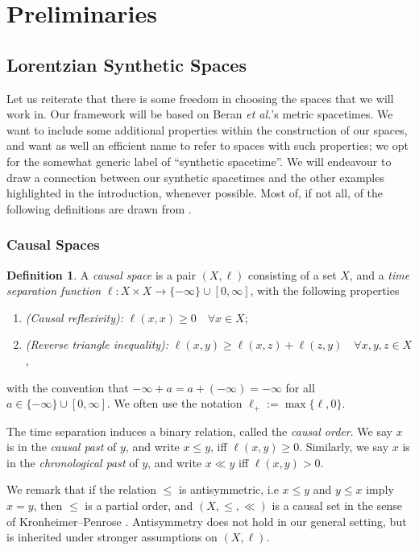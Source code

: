 \documentclass{article}
\theoremstyle{definition}
\newtheorem{defn}{Definition}[section]
\begin{document}
\section{Preliminaries} 
\subsection{Lorentzian Synthetic Spaces}
Let us reiterate that there is some freedom in choosing the spaces that we will work in. Our framework will be based on Beran {\it et al.\@}'s metric spacetimes. We want to include some additional properties within the construction of our spaces, and want as well an efficient name to refer to spaces with such properties; we opt for the somewhat generic label of ``synthetic spacetime''. We will endeavour to draw a connection between our synthetic spacetimes and the other examples highlighted in the introduction, whenever possible. Most of, if not all, of the following definitions are drawn from \cite{McCannII}. 
\subsubsection{Causal Spaces}
\begin{defn}
A {\it causal space} is a pair $(X,\ell)$ consisting of a set $X$, and a {\it time separation function} $\ell: X\times X\to \{-\infty\}\cup [0,\infty]$, with the following properties
\begin{enumerate}
\item {\it (Causal reflexivity):} $\ell(x,x)\geq 0\quad \forall x\in X$;
\item {\it (Reverse triangle inequality):} $\ell(x,y)\geq \ell(x,z)+\ell(z,y) \quad \forall x,y,z\in X$,
\end{enumerate}
with the convention that $-\infty+a=a+(-\infty) =-\infty$ for all $a\in \{-\infty\}\cup [0,\infty]$. We often use the notation $\ell_+:= \max\{\ell, 0\}$. 
\end{defn}
The time separation induces a binary relation, called the {\it causal order}. We say $x$ is in the {\it causal past} of $y$, and write $x\leq y$, iff $\ell(x,y)\geq 0$. Similarly, we say $x$ is in the {\it chronological past} of $y$, and write $x\ll y$ iff $\ell(x,y)>0$.  

We remark that if the relation $\leq$ is antisymmetric, i.e $x\leq y$ and $y\leq x$ imply $x=y$, then $\leq$ is a partial order, and $(X,\leq, \ll)$ is a causal set in the sense of Kronheimer--Penrose \cite{KP}. Antisymmetry does not hold in our general setting, but is inherited under stronger assumptions on $(X,\ell)$. 
\end{document}
